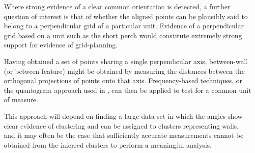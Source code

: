\documentclass[../../ArchStats.tex]{subfiles}
\begin{document}
Where strong evidence of a clear common orientation is detected, a further question of interest is that of whether the aligned points can be plausibly said to belong to a perpendicular grid of a particular unit. Evidence of a perpendicular grid based on a  unit such as the short perch \cite{Blair2013} would constitute extremely strong support for evidence of grid-planning.

Having obtained a set of points sharing a single perpendicular axis, between-wall (or between-feature)  might be obtained by measuring the distances between the orthogonal projections of points onto that axis. Frequency-based techniques, or the quantogram approach used in \cite{Kendall1974, Kendall2013}, can then be applied to test  for a common unit of measure.

This approach will depend on finding a large data set in which the angles show clear evidence of clustering and can be assigned to clusters representing walls, and it may often be the case that sufficiently accurate measurements cannot be obtained from the inferred clusters to perform a meaningful analysis.






\end{document}
